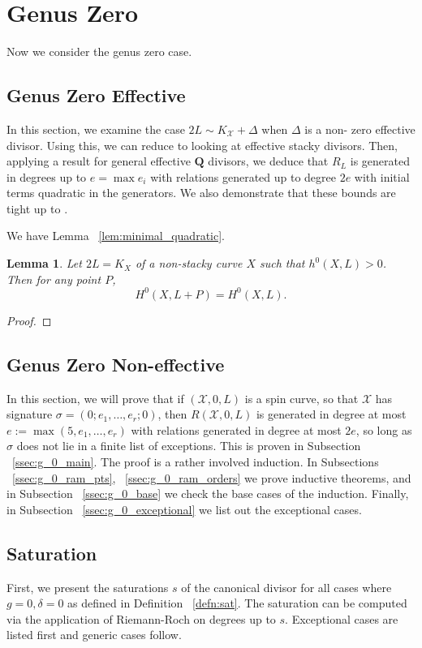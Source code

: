 \documentclass{amsart}
\theoremstyle{plain}
\newtheorem{lem}[thm]{Lemma}
\theoremstyle{definition}
\theoremstyle{remark}
\numberwithin{equation}{section}
\newcommand\ssec{\subsection}
\newcommand \sx{\mathscr X}
\newcommand \halfcan{L}
\begin{document}

\section{Genus Zero}
\label{sec:g_0}
Now we consider the genus zero case.

\ssec{Genus Zero Effective}
\label{ssec:g_0_effective}

In this section, we examine the case $2\halfcan\sim K_\sx+\Delta$ 
when $\Delta$ is a non- zero effective divisor.  Using this, we can 
reduce to looking at effective stacky divisors.  Then, applying a 
result for general effective $\mathbf{Q}$ divisors, we deduce that $
R_{\halfcan}$ is generated in degrees up to $e=\max{e_i}$ with 
relations generated up to degree $2e$ with initial terms quadratic 
in the generators.  We also demonstrate that these bounds are tight 
up to .

We have Lemma ~\ref{lem:minimal_quadratic}.


\begin{lem}\label{lem:add_point_effective_divisor_deg_1_but_not_deg_2_generators}
Let $2\halfcan=K_X$ of a non-stacky curve $X$ such that $h^0(X, \halfcan) > 0$.  Then for any point $P$, 
\[
	H^0(X, \halfcan+P)=H^0(X,\halfcan).
\]
\end{lem}
\begin{proof}
\end{proof}

\ssec{Genus Zero Non-effective}
\label{ssec:g_0_non_effective}
In this section, we will prove that if $(\sx , 0, L)$ is a spin curve,
so that $\sx$ has signature $\sigma = (0; e_1, \ldots , e_r; 0)$, then
$R(\sx , 0, L)$ is generated in degree at most $e := \max(5, e_1, \ldots,
e_r)$ with relations generated in degree at most $2e$, so long as $\sigma$
does not lie in a finite list of exceptions. This is proven in
Subsection ~\ref{ssec:g_0_main}. The proof is a rather
involved induction. In Subsections ~\ref{ssec:g_0_ram_pts},
~\ref{ssec:g_0_ram_orders}  we prove inductive theorems, and in
Subsection ~\ref{ssec:g_0_base} we check the base cases of the
induction. Finally, in Subsection ~\ref{ssec:g_0_exceptional} we
list out the exceptional cases.

\ssec{Saturation}
\label{ssec:g_0_saturation}
First, we present the saturations $s$ of the canonical divisor for
all cases where $g = 0, \delta = 0$ as defined in Definition
~\ref{defn:sat}. The saturation can be computed via the application
of Riemann-Roch on degrees up to $s$. Exceptional cases are listed
first and generic cases follow.
\end{document}

